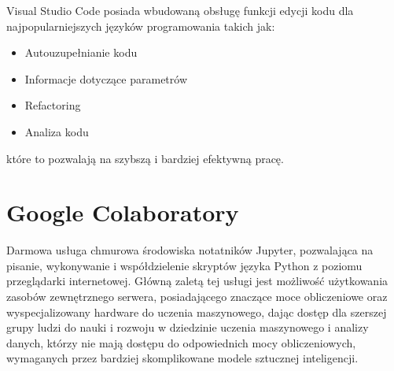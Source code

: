 Visual Studio Code posiada wbudowaną obsługę funkcji edycji kodu dla najpopularniejszych języków programowania takich jak:

\begin{itemize}
	\item Autouzupełnianie kodu
	\item Informacje dotyczące parametrów 
	\item Refactoring
	\item Analiza kodu
\end{itemize}
które to pozwalają na szybszą i bardziej efektywną pracę.
 

\section{Google Colaboratory}
Darmowa usługa chmurowa środowiska notatników Jupyter, pozwalająca na pisanie, wykonywanie i współdzielenie skryptów języka Python z poziomu przeglądarki internetowej. Główną zaletą tej usługi jest możliwość użytkowania zasobów zewnętrznego serwera, posiadającego znaczące moce obliczeniowe oraz wyspecjalizowany hardware do uczenia maszynowego, dając dostęp dla szerszej grupy ludzi do nauki i rozwoju w dziedzinie uczenia maszynowego i analizy danych, którzy nie mają dostępu do odpowiednich mocy obliczeniowych, wymaganych przez bardziej skomplikowane modele sztucznej inteligencji.